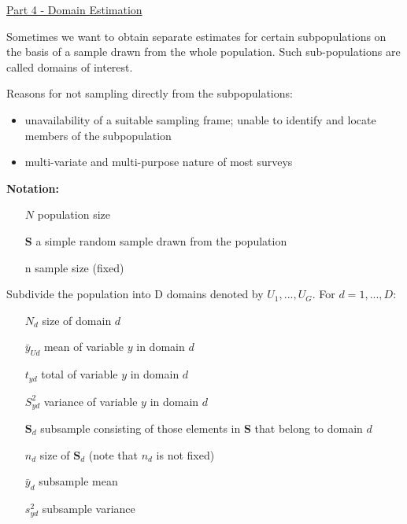 \documentclass[10pt,landscape]{article}
\begin{document}
\raggedright
\footnotesize
\begin{multicols}{3}


\setlength{\premulticols}{1pt}
\setlength{\postmulticols}{1pt}
\setlength{\multicolsep}{1pt}
\setlength{\columnsep}{2pt}

\begin{center}
     \Large{\underline{Part 4 - Domain Estimation}} \\
\end{center}

Sometimes we want to obtain separate estimates for certain subpopulations on the basis of a sample drawn from the whole population. Such sub-populations are called domains of interest.

\vspace{5}

Reasons for not sampling directly from the subpopulations:
\begin{itemize}
  \item unavailability of a suitable sampling frame; unable to identify and locate members of the subpopulation
  \item multi-variate and multi-purpose nature of most surveys
\end{itemize}

\textbf{Notation:}
\begin{itemize}
  \item[$N$] population size
  \item[\textbf{S}] a simple random sample drawn from the population
  \item[n] sample size (fixed)
\end{itemize}

Subdivide the population into D domains denoted by $U_{1}, ... , U_{G}$. For $d = 1,...,D$:

\begin{itemize}
  \item[$N_{d}$] size of domain $d$
  \item[$\bar{y}_{Ud}$] mean of variable $y$ in domain $d$
  \item[$t_{yd}$] total of variable $y$ in domain $d$
  \item[$S^{2}_{yd}$] variance of variable $y$ in domain $d$
  \item[$\textbf{S}_{d}$] subsample consisting of those elements in \textbf{S} that belong to domain $d$
  \item[$n_{d}$] size of $\textbf{S}_{d}$ (note that $n_{d}$ is not fixed)
  \item[$\bar{y}_{d}$] subsample mean
  \item[$s^{2}_{yd}$] subsample variance
\end{itemize}


\end{multicols}
\end{document}
